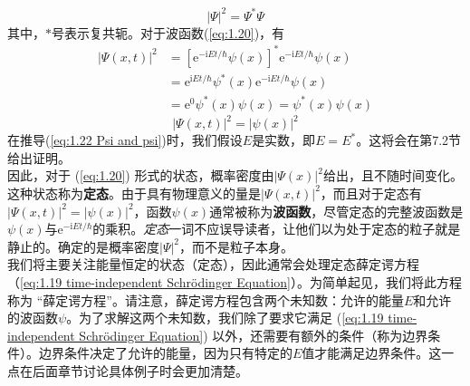 	\begin{equation}
		\boxed{\left|\Psi\right|^2=\Psi^{\ast}\Psi}
		\label{eq:1.21 square of Psi}
	\end{equation}
	其中，$\ast$号表示复共轭。对于波函数(\ref{eq:1.20})，有
	\begin{equation*}
		\begin{aligned}
			\left|\Psi\left(x,t\right)\right|^2 &=\left[\mathrm{e}^{-\mathrm{i}Et/\hbar}\psi\left(x\right)\right]^{\ast}\mathrm{e}^{-\mathrm{i}Et/\hbar}\psi\left(x\right)\\
			& = \mathrm{e}^{\mathrm{i}Et/\hbar}\psi^{\ast}\left(x\right)\mathrm{e}^{-\mathrm{i}Et/\hbar}\psi\left(x\right)\\
			& = \mathrm{e}^0\psi^{\ast}\left(x\right)\psi\left(x\right)=\psi^\ast\left(x\right)\psi\left(x\right)
		\end{aligned}
	\end{equation*}
	\begin{equation}
		\left|\Psi\left(x,t\right)\right|^2=\left|\psi\left(x\right)\right|^2
		\label{eq:1.22 Psi and psi}
	\end{equation}
	在推导(\ref{eq:1.22 Psi and psi})时，我们假设$E$是实数，即$E=E^{\ast}$。这将会在第7.2节给出证明。\\
	\indent 因此，对于 (\ref{eq:1.20}) 形式的状态，概率密度由$\left|\Psi\left(x\right)\right|^2$给出，且不随时间变化。这种状态称为\textbf{定态}。由于具有物理意义的量是$\left|\Psi\left(x,t\right)\right|^2$，而且对于定态有$\left|\Psi\left(x,t\right)\right|^2=\left|\psi\left(x\right)\right|^2$，函数$\psi\left(x\right)$通常被称为\textbf{波函数}，尽管定态的完整波函数是$\psi\left(x\right)$与$\mathrm{e}^{-\mathrm{i}Et/\hbar}$的乘积。\textit{定态}一词不应误导读者，让他们以为处于定态的粒子就是静止的。确定的是概率密度$\left|\Psi\right|^2$，而不是粒子本身。\\
	\indent 我们将主要关注能量恒定的状态（定态），因此通常会处理定态薛定谔方程（\ref{eq:1.19 time-independent Schrödinger Equation}）。为简单起见，我们将此方程称为 “薛定谔方程”。请注意，薛定谔方程包含两个未知数：允许的能量$E$和允许的波函数$ \psi$。为了求解这两个未知数，我们除了要求它满足 (\ref{eq:1.19 time-independent Schrödinger Equation}) 以外，还需要有额外的条件（称为边界条件）。边界条件决定了允许的能量，因为只有特定的$E$值才能满足边界条件。这一点在后面章节讨论具体例子时会更加清楚。
	
